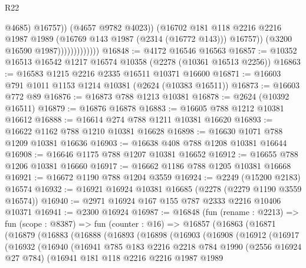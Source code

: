 \begin{lexlean}{R22}
\begin{coremodule}
                                      @4685)
                                    @16757))
                                (@4657 @9782 @4023))
                              (@16702
                                @181
                                @118
                                @2216
                                @2216
                                @1987
                                @1989
                                (@16769 @143 @1987 (@2314 (@16772 @143)))
                                @16757))
                            (@3200 @16590 @1987)))))))))))))
@16848 := @4172 @16546 @16563
@16857 := @10352 @16513 @16542 @1217 @16574 @10358 (@2278 (@10361 @16513 @2256))
@16863 := @16583 @1215 @2216 @2335 @16511 @10371 @16600
@16871 := @16603 @791 @1011 @1153 @1214 @10381 (@2624 (@10383 @16511))
@16873 := @16603 @772 @89
@16876 := @16873 @788 @1213 @10381
@16878 := @2624 (@10392 @16511)
@16879 := @16876 @16878
@16883 := @16605 @788 @1212 @10381 @16612
@16888 := @16614 @274 @788 @1211 @10381 @16620
@16893 := @16622 @1162 @788 @1210 @10381 @16628
@16898 := @16630 @1071 @788 @1209 @10381 @16636
@16903 := @16638 @408 @788 @1208 @10381 @16644
@16908 := @16646 @1175 @788 @1207 @10381 @16652
@16912 := @16655 @788 @1206 @10381 @16660
@16917 := @16662 @1186 @788 @1205 @10381 @16668
@16921 := @16672 @1190 @788 @1204 @3559
@16924 := @2249 (@15200 @2183) @16574
@16932 := @16921 @16924 @10381 @16685 (@2278 (@2279 @1190 @3559 @16574))
@16940 := @2971 @16924 @167 @155 @787 @2333 @2216 @10406 @10371
@16941 := @2300 @16924
@16987 := @16848
    (fun (rename : @2213) =>
    fun (scope : @8387) =>
    fun (counter : @16) =>
    @16857
      (@16863
        (@16871
          (@16879
            (@16883
              (@16888
                (@16893
                  (@16898
                    (@16903
                      (@16908
                        (@16912
                          (@16917
                            (@16932
                              (@16940
                                (@16941
                                  @785
                                  @183
                                  @2216
                                  @2218
                                  @784
                                  @1990
                                  (@2556 @16924 @27 @784)
                                  (@16941
                                    @181
                                    @118
                                    @2216
                                    @2216
                                    @1987
                                    @1989

\end{coremodule}
\end{lexlean}
